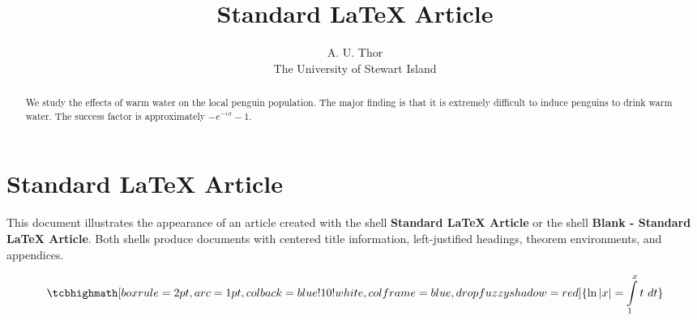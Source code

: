 \documentclass{article}%
\begin{document}
\title{Standard
\LaTeX{}
Article}
\author{A. U. Thor\\The University of Stewart Island}
\maketitle

\begin{abstract}
We study the effects of warm water on the local penguin population. The major
finding is that it is extremely difficult to induce penguins to drink warm
water. The success factor is approximately $-e^{-i\pi}-1$.

\end{abstract}

\section{Standard
\LaTeX{}
Article}

This document illustrates the appearance of an article created with the shell
\textbf{Standard LaTeX Article} or the shell \textbf{Blank - Standard LaTeX
Article}. Both shells produce documents with centered title information,
left-justified headings, theorem environments, and appendices.%

\begin{equation}
\tcbhighmath[boxrule=2pt,arc=1pt,colback=blue!10!white,colframe=blue,
drop fuzzy shadow=red]{ \ln|x| = \int\limits_1^x t~dt }
\end{equation}%
\end{document}
